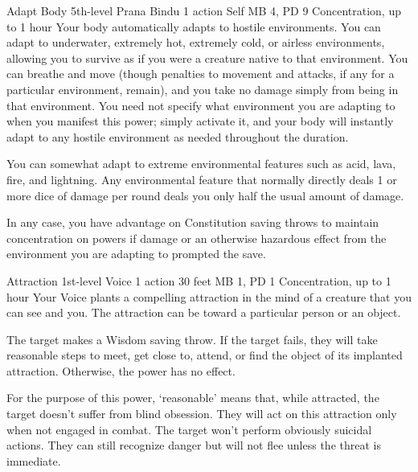 \DndPowerHeader%
    {Adapt Body\label{pwr:adapt_body}}
    {5th-level Prana Bindu}
    {1 action}
    {Self}
    {MB 4, PD 9}
    {Concentration, up to 1 hour}
Your body automatically adapts to hostile
environments. You can adapt to underwater, extremely hot,
extremely cold, or airless environments, allowing you to survive
as if you were a creature native to that environment. You
can breathe and move (though penalties to movement and attacks,
if any for a particular environment, remain), and you take
no damage simply from being in that environment. You need
not specify what environment you are adapting to when you
manifest this power; simply activate it, and your body will
instantly adapt to any hostile environment as needed throughout
the duration.

You can somewhat adapt to extreme environmental features such
as acid, lava, fire, and lightning. Any environmental feature
that normally directly deals 1 or more dice of damage per
round deals you only half the usual amount of damage.

In any case, you have advantage on Constitution saving throws
to maintain concentration on powers if damage or an otherwise
hazardous effect from the environment you are adapting to
prompted the save.

\DndPowerHeader%
    {Attraction\label{pwr:attraction}}
    {1st-level Voice}
    {1 action}
    {30 feet}
    {MB 1, PD 1}
    {Concentration, up to 1 hour}
Your Voice plants a compelling attraction
in the mind of a creature that you can see and you. The attraction
can be toward a particular person or an object.

The target makes a Wisdom saving throw. If the target fails,
they will take reasonable steps to meet, get close to, attend,
or find the object of its implanted attraction. Otherwise,
the power has no effect.

For the purpose of this power, `reasonable' means that, while
attracted, the target doesn't suffer from blind obsession.
They will act on this attraction only when not engaged in
combat. The target won't perform obviously suicidal actions.
They can still recognize danger but will not flee unless the
threat is immediate.


